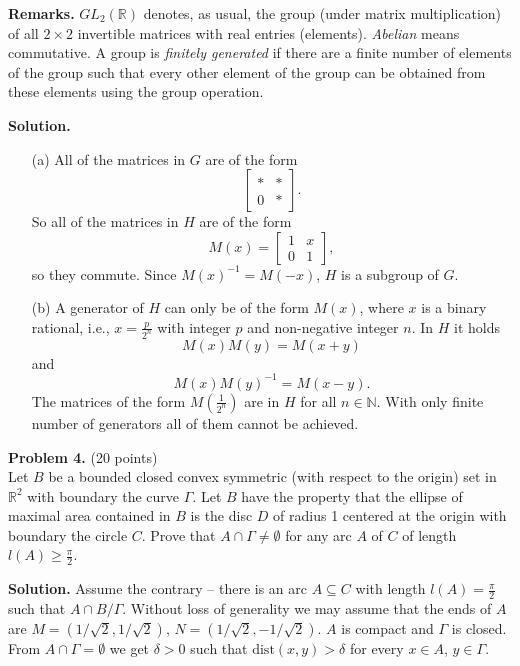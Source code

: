\documentclass{article}
\begin{document}
\textbf{Remarks.} \( GL_2(\mathbb{R}) \) denotes, as usual, the group (under matrix multiplication) of all \( 2 \times 2 \) invertible matrices with real entries (elements). \textit{Abelian} means commutative. A group is \textit{finitely generated} if there are a finite number of elements of the group such that every other element of the group can be obtained from these elements using the group operation.

\textbf{Solution.}
\begin{itemize}
    \item[(a)] All of the matrices in \( G \) are of the form
    \[
    \begin{bmatrix}
    * & * \\
    0 & *
    \end{bmatrix}.
    \]
    So all of the matrices in \( H \) are of the form
    \[
    M(x) = \begin{bmatrix}
    1 & x \\
    0 & 1
    \end{bmatrix},
    \]
    so they commute. Since \( M(x)^{-1} = M(-x) \), \( H \) is a subgroup of \( G \).

    \item[(b)] A generator of \( H \) can only be of the form \( M(x) \), where \( x \) is a binary rational, i.e., \( x = \frac{p}{2^n} \) with integer \( p \) and non-negative integer \( n \). In \( H \) it holds
    \[
    M(x)M(y) = M(x + y)
    \]
    and
    \[
    M(x)M(y)^{-1} = M(x - y).
    \]
    The matrices of the form \( M\left(\frac{1}{2^n}\right) \) are in \( H \) for all \( n \in \mathbb{N} \). With only finite number of generators all of them cannot be achieved.
\end{itemize}

\textbf{Problem 4.} (20 points) \\
Let \( B \) be a bounded closed convex symmetric (with respect to the origin)
set in \( \mathbb{R}^2 \) with boundary the curve \( \Gamma \). Let \( B \)
have the property that the ellipse of maximal area contained in \( B \)
is the disc \( D \) of radius 1 centered at the origin with boundary
the circle \( C \). Prove that \( A \cap \Gamma \neq \emptyset \)
for any arc \( A \) of \( C \) of length \( l(A) \geq \frac{\pi}{2} \).

\textbf{Solution.} Assume the contrary -- there is an arc \( A \subseteq C \) with length \( l(A) = \frac{\pi}{2} \) such that \( A \cap B/\Gamma \). Without loss of generality we may assume that the ends of \( A \) are \( M = (1/\sqrt{2}, 1/\sqrt{2}) \), \( N = (1/\sqrt{2}, -1/\sqrt{2}) \). \( A \) is compact and \( \Gamma \) is closed. From \( A \cap \Gamma = \emptyset \) we get \( \delta > 0 \) such that \( \text{dist}(x, y) > \delta \) for every \( x \in A \), \( y \in \Gamma \).
\end{document}
